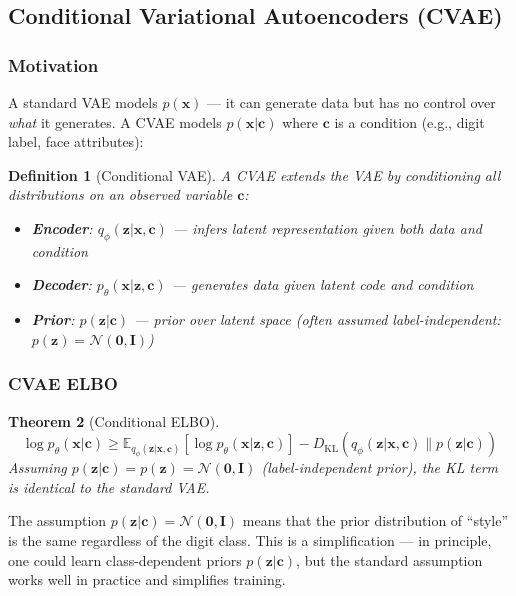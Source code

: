 \documentclass[11pt,a4paper]{article}
\newtheorem{theorem}{Theorem}[section]
\newtheorem{definition}[theorem]{Definition}
\begin{document}
\subsection{Conditional Variational Autoencoders (CVAE)}

\subsubsection{Motivation}

A standard VAE models $p(\mathbf{x})$ — it can generate data but has no control over \emph{what} it generates. A CVAE models $p(\mathbf{x} | \mathbf{c})$ where $\mathbf{c}$ is a condition (e.g., digit label, face attributes):

\begin{definition}[Conditional VAE]
A CVAE extends the VAE by conditioning all distributions on an observed variable $\mathbf{c}$:
\begin{itemize}
    \item \textbf{Encoder}: $q_\phi(\mathbf{z} | \mathbf{x}, \mathbf{c})$ --- infers latent representation given \emph{both} data and condition
    \item \textbf{Decoder}: $p_\theta(\mathbf{x} | \mathbf{z}, \mathbf{c})$ --- generates data given latent code and condition
    \item \textbf{Prior}: $p(\mathbf{z} | \mathbf{c})$ --- prior over latent space (often assumed label-independent: $p(\mathbf{z}) = \mathcal{N}(\mathbf{0}, \mathbf{I})$)
\end{itemize}
\end{definition}

\subsubsection{CVAE ELBO}

\begin{theorem}[Conditional ELBO]
\[
\log p_\theta(\mathbf{x} | \mathbf{c}) \geq \mathbb{E}_{q_\phi(\mathbf{z}|\mathbf{x},\mathbf{c})}\left[\log p_\theta(\mathbf{x} | \mathbf{z}, \mathbf{c})\right] - D_{\mathrm{KL}}\left(q_\phi(\mathbf{z}|\mathbf{x},\mathbf{c}) \| p(\mathbf{z}|\mathbf{c})\right)
\]
Assuming $p(\mathbf{z}|\mathbf{c}) = p(\mathbf{z}) = \mathcal{N}(\mathbf{0}, \mathbf{I})$ (label-independent prior), the KL term is identical to the standard VAE.
\end{theorem}

\begin{note}
The assumption $p(\mathbf{z}|\mathbf{c}) = \mathcal{N}(\mathbf{0}, \mathbf{I})$ means that the prior distribution of ``style'' is the same regardless of the digit class. This is a simplification --- in principle, one could learn class-dependent priors $p(\mathbf{z}|\mathbf{c})$, but the standard assumption works well in practice and simplifies training.
\end{note}
\end{document}
